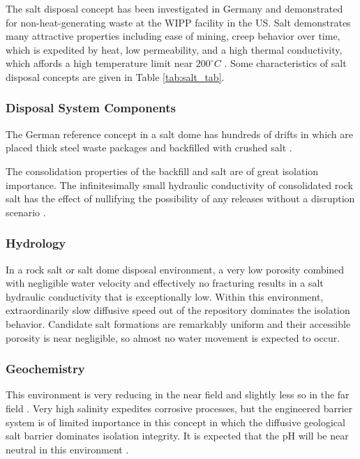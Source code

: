 The salt disposal concept has been investigated in Germany and demonstrated for 
non-heat-generating waste at the \gls{WIPP} facility in the US. Salt 
demonstrates many attractive properties including ease of mining, creep behavior 
over time, which is expedited by heat, low permeability, and a high thermal 
conductivity, which affords a high temperature limit near $200^{\circ}C$ 
\cite{hardin_generic_2011} .
Some characteristics of salt disposal 
concepts are given in Table \ref{tab:salt_tab}.   



\subsubsection{Disposal System Components}

The German reference concept in a salt dome has hundreds of drifts in which 
are placed thick steel waste packages and backfilled with crushed salt 
\cite{von_lensa_red-impact_2008}. 

The consolidation properties of the backfill and salt are of great isolation 
importance. The infinitesimally small hydraulic conductivity of consolidated 
rock salt has the effect of nullifying the possibility of any releases without 
a disruption scenario \cite{brewitz_long-term_2002}.


\subsubsection{Hydrology}

In a rock salt or salt dome disposal environment, a very low porosity combined 
with negligible water velocity and effectively no fracturing results in a 
salt hydraulic conductivity that is exceptionally low. Within this environment,   
extraordinarily slow diffusive speed out of the repository dominates the 
isolation behavior. Candidate salt formations are remarkably uniform and their 
accessible porosity is near negligible, so almost no water movement is expected to 
occur. 

\subsubsection{Geochemistry}

This environment is very reducing in the near field and slightly less so in 
the far field \cite{clayton_generic_2011}. Very high salinity
expedites corrosive processes, but the engineered barrier system 
is of limited importance in this concept in which the diffusive geological salt barrier 
dominates isolation integrity.  It is expected that the pH will be near
neutral in this environment \cite{von_lensa_red-impact_2008, clayton_generic_2011}.

